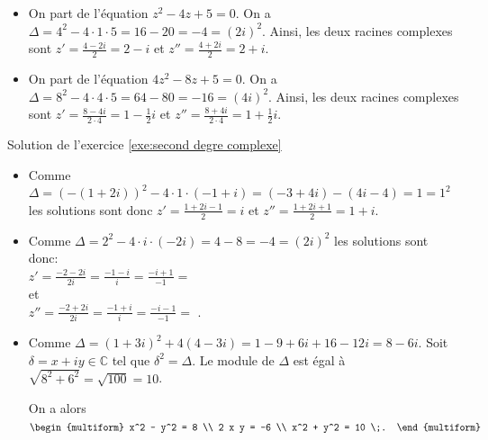 \begin{corrige}
\begin{sol}
\begin{itemize}
			Ainsi, les deux racines complexes sont $z' = \frac{2-4i}{2} = 1 - 2i$ et $z'' = \frac{2+4i}{2} = 1 + 2i$. 
		\item On part de l'\'equation $z^2 - 4 z + 5 = 0$. 
			On a $\Delta = 4^2 - 4 \cdot 1 \cdot 5 = 16 - 20 = -4 = (2i)^2$.
			Ainsi, les deux racines complexes sont $z' = \frac{4-2i}{2} = 2 - i$ et $z'' = \frac{4+2i}{2} = 2 + i$. 
		\item On part de l'\'equation $4 z^2 - 8 z + 5 = 0$. 
			On a $\Delta = 8^2 - 4 \cdot 4 \cdot 5 = 64 - 80 = -16 = (4i)^2$.
			Ainsi, les deux racines complexes sont 
			$z' = \frac{8-4i}{2 \cdot 4} = 1 - \frac{1}{2} i$ et $z'' = \frac{8+4i}{2 \cdot 4} = 1 + \frac{1}{2} i$. 
	\end{itemize}
\end{sol}
\begin{sol}
\label{sol:second degre complexe}
Solution de l'exercice \ref{exe:second degre complexe} \\
\begin{itemize} 
\item Comme $\Delta = (- (1 + 2 i) )^2 - 4 \cdot 1 \cdot (-1+i) = (-3+4i)-(4i-4) = 1 = 1^2$
      les solutions sont donc $z' = \frac{1+2i-1}{2} = i$ et $z'' = \frac{1+2i+1}{2} = 1+i$.
\item Comme $\Delta = 2^2 - 4 \cdot i \cdot (-2i) = 4-8 = -4 = (2i)^2$
      les solutions sont donc: \\
      $z' = \frac{-2-2i}{2i} = \frac{-1-i}{i} = \frac{-i+1}{-1} = $ 
      \\ et \\
      $z'' = \frac{-2+2i}{2i} = \frac{-1+i}{i} = \frac{-i-1}{-1} = $ .
\item Comme $\Delta = (1+3i)^2 + 4 (4 - 3i) = 1-9 + 6i + 16 - 12i = 8 - 6i$. 
      Soit $\delta = x + i y \in \mathbb{C}$ tel que $\delta^2 = \Delta$.
      Le module de $\Delta$ est \'egal \`a $\sqrt{8^2 + 6^2} = \sqrt{100} = 10$.
      
      On a alors 
      $\displaystyle{
	      \begin{multiform} 
		      x^2 - y^2 = 8       \\
		      2 x y     = -6      \\
		      x^2 + y^2 = 10      \;.
	      \end{multiform}
      }$
      

\end{itemize}
\end{sol}
\end{corrige}
